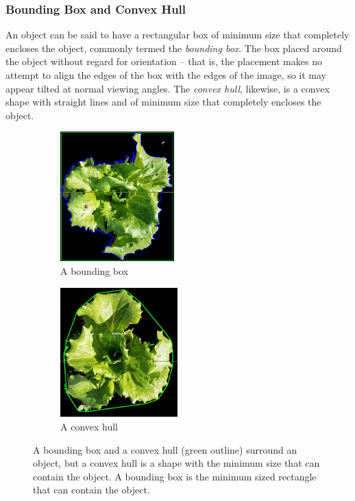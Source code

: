 \documentclass[letterpaper, notitlepage]{report}
\begin{document}
{\subsubsection{Bounding Box and Convex Hull}
An object can be said to have a rectangular box of minimum size that completely encloses the object, commonly termed the \textit{bounding box}. The box placed around the object without regard for orientation -- that is, the placement makes no attempt to align the edges of the box with the edges of the image, so it may appear tilted at normal viewing angles. The \textit{convex hull}, likewise, is a convex shape with straight lines and of minimum size that completely encloses the object.   
\begin{figure}[h!]
	\centering
	\begin{subfigure}[h]{.48\textwidth}
	  \centering
	  \includegraphics[height=5cm]{./figures/shape-bounding-box.jpg}
	  \caption{A bounding box}
	  \label{fig:bounding-box}
	\end{subfigure}
	\hfill
	\begin{subfigure}[h]{.48\textwidth}
	  \centering
	  \includegraphics[height=5cm]{./figures/shape-convex-hull.jpg}
	  \caption{A convex hull}
	  \label{fig:convex-hull}
	\end{subfigure}
	\caption[Bounding box and convex hull]{A bounding box and a convex hull (green outline) surround an object, but a convex hull is a shape with the minimum size that can contain the object. A bounding box is the minimum sized rectangle that can contain the object.}
	\label{fig:bounding-and-hull}

\end{figure}}
\end{document}
